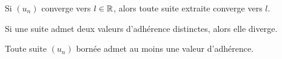 \documentclass[../main.tex]{subfile}
\begin{document}
\begin{theo}
	Si $(u_n)$ converge vers $l \in \mathbb{R}$, alors toute suite extraite converge vers $l$.
\end{theo}


\begin{prop}
	Si une suite admet deux valeurs d'adhérence distinctes, alors elle diverge.
\end{prop}

\begin{theo}
	Toute suite $(u_n)$ bornée admet au moins une valeur d'adhérence.
\end{theo}
\end{document}
